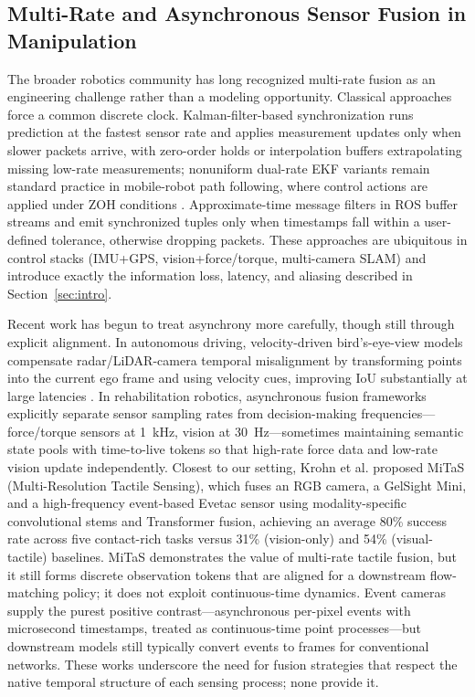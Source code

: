 \documentclass[conference]{IEEEtran}
\begin{document}
\subsection{Multi-Rate and Asynchronous Sensor Fusion in Manipulation}
The broader robotics community has long recognized multi-rate fusion as an engineering challenge rather than a modeling opportunity. Classical approaches force a common discrete clock. Kalman-filter-based synchronization \cite{kalman1960} runs prediction at the fastest sensor rate and applies measurement updates only when slower packets arrive, with zero-order holds or interpolation buffers extrapolating missing low-rate measurements; nonuniform dual-rate EKF variants remain standard practice in mobile-robot path following, where control actions are applied under ZOH conditions \cite{piza2022multirate}. Approximate-time message filters in ROS buffer streams and emit synchronized tuples only when timestamps fall within a user-defined tolerance, otherwise dropping packets. These approaches are ubiquitous in control stacks (IMU+GPS, vision+force/torque, multi-camera SLAM) and introduce exactly the information loss, latency, and aliasing described in Section~\ref{sec:intro}.

Recent work has begun to treat asynchrony more carefully, though still through explicit alignment. In autonomous driving, velocity-driven bird's-eye-view models compensate radar/LiDAR-camera temporal misalignment by transforming points into the current ego frame and using velocity cues, improving IoU substantially at large latencies \cite{hayes2024velocity}. In rehabilitation robotics, asynchronous fusion frameworks explicitly separate sensor sampling rates from decision-making frequencies---force/torque sensors at 1~kHz, vision at 30~Hz---sometimes maintaining semantic state pools with time-to-live tokens so that high-rate force data and low-rate vision update independently. Closest to our setting, Krohn et al. \cite{krohn2026mitas} proposed MiTaS (Multi-Resolution Tactile Sensing), which fuses an RGB camera, a GelSight Mini, and a high-frequency event-based Evetac sensor using modality-specific convolutional stems and Transformer fusion, achieving an average 80\% success rate across five contact-rich tasks versus 31\% (vision-only) and 54\% (visual-tactile) baselines. MiTaS demonstrates the value of multi-rate tactile fusion, but it still forms discrete observation tokens that are aligned for a downstream flow-matching policy; it does not exploit continuous-time dynamics. Event cameras \cite{gallego2020event} supply the purest positive contrast---asynchronous per-pixel events with microsecond timestamps, treated as continuous-time point processes---but downstream models still typically convert events to frames for conventional networks. These works underscore the need for fusion strategies that respect the native temporal structure of each sensing process; none provide it.
\end{document}

